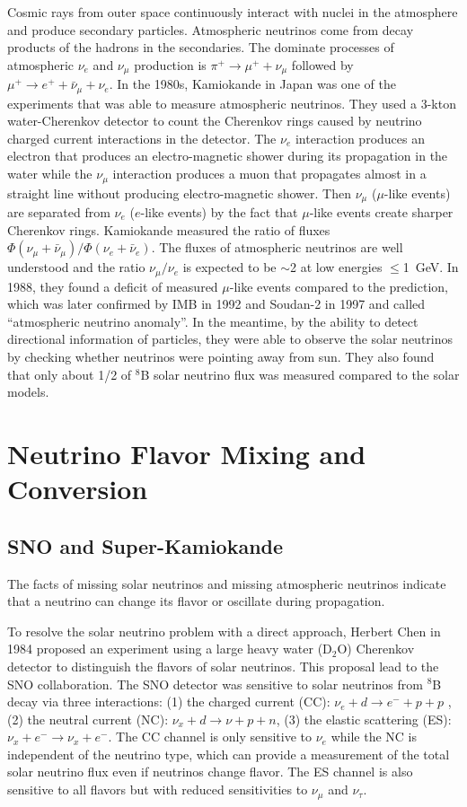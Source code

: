 \documentclass[preprint,12pt]{elsarticle}
\numberwithin{equation}{section}
\begin{document}
Cosmic rays from outer space continuously interact with nuclei in the atmosphere and produce secondary particles. Atmospheric neutrinos come from decay products of the hadrons in the secondaries. The dominate processes of atmospheric $\nu_e$ and $\nu_\mu$ production is $\pi^+\to\mu^+ + \nu_\mu$ followed by $\mu^+ \to e^+ + \bar{\nu}_\mu + \nu_e$. In the 1980s, Kamiokande in Japan was one of the experiments that was able to measure atmospheric neutrinos. They used a 3-kton water-Cherenkov detector to count the Cherenkov rings caused by neutrino charged current interactions in the detector. The $\nu_e$ interaction produces an electron that produces an electro-magnetic shower during its propagation in the water while the $\nu_\mu$ interaction produces a muon that propagates almost in a straight line without producing electro-magnetic shower. Then $\nu_\mu$ ($\mu$-like events) are separated from $\nu_e$ ($e$-like events) by the fact that $\mu$-like events create sharper Cherenkov rings. Kamiokande measured the ratio of fluxes $\Phi(\nu_\mu+\bar{\nu}_\mu)/\Phi(\nu_e+\bar{\nu}_e)$. The fluxes of atmospheric neutrinos are well understood and the ratio $\nu_\mu/\nu_e$ is expected to be $\sim$2 at low energies $\leq$1~GeV. In 1988, they found a deficit of measured $\mu$-like events compared to the prediction, which was later confirmed by IMB in 1992\cite{imb} and Soudan-2 in 1997\cite{soudan2} and called ``atmospheric neutrino anomaly''\cite{atmNuReview}. In the meantime, by the ability to detect directional information of particles, they were able to observe the solar neutrinos by checking whether neutrinos were pointing away from sun. They also found that only about 1/2 of $^8$B solar neutrino flux was measured compared to the solar models\cite{kamioII}. 

\section{Neutrino Flavor Mixing and Conversion}
\subsection{SNO and Super-Kamiokande}
The facts of missing solar neutrinos and missing atmospheric neutrinos indicate that a neutrino can change its flavor or oscillate during propagation.

To resolve the solar neutrino problem with a direct approach, Herbert Chen in 1984 proposed an experiment using a large heavy water (D$_2$O) Cherenkov detector to distinguish the flavors of solar neutrinos\cite{herbertChen}. This proposal lead to the SNO collaboration. The SNO detector was sensitive to solar neutrinos from $^8$B decay via three interactions: (1) the charged current (CC): $\nu_e+d\to e^-+p+p$ , (2) the neutral current (NC): $\nu_x+d\to\nu+p+n$, (3) the elastic scattering (ES): $\nu_x+e^-\to \nu_x+e^-$. The CC channel is only sensitive to $\nu_e$ while the NC is independent of the neutrino type, which can provide a measurement of the total solar neutrino flux even if neutrinos change flavor. The ES channel is also sensitive to all flavors but with reduced sensitivities to $\nu_\mu$ and $\nu_\tau$\cite{SNO}.
\end{document}
